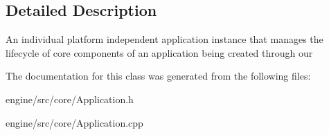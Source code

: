 \subsection{Detailed Description}
An individual platform independent application instance that manages the lifecycle of core components of an application being created through our 

The documentation for this class was generated from the following files\+:\begin{DoxyCompactItemize}
\item 
engine/src/core/Application.\+h\item 
engine/src/core/Application.\+cpp\end{DoxyCompactItemize}
